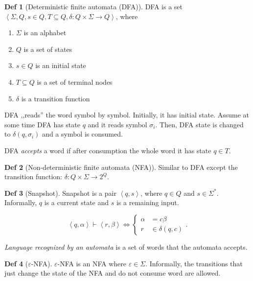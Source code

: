 \documentclass[a4paper]{article}
\theoremstyle{definition}
\newtheorem{definition}{Def}
\begin{document}
\begin{definition}[Deterministic finite automata (DFA)]
  DFA is a set \(\left< \Sigma, Q, s \in Q, T \subseteq Q, \delta : Q \times
  \Sigma \to Q\right>\), where
  \begin{enumerate}
    \item \(\Sigma\) is an alphabet
    \item \(Q\) is a set of states
    \item \(s \in Q\) is an initial state
    \item \(T \subseteq Q\) is a set of terminal nodes
    \item \(\delta\) is a transition function
  \end{enumerate}
\end{definition}

DFA ,,reads'' the word symbol by symbol.
Initially, it has initial state.
Assume at some time DFA has state \(q\) and it reads symbol \(\sigma_i\).
Then, DFA state is changed to \(\delta(q, \sigma_i)\) and a symbol is consumed.

DFA \textit{accepts} a word if after consumption the whole word it has state
\(q \in T\).


\begin{definition}[Non-deterministic finite automata (NFA)]
  Similar to DFA except the transition function:
  \(\delta : Q \times \Sigma \to 2^Q\).
\end{definition}

\begin{definition}[Snapshot]
  Snapshot is a pair \(\left<q, s\right>\), where \(q \in Q\) and \(s \in
  \Sigma^*\).
  Informally, \(q\) is a current state and \(s\) is a remaining input.
\end{definition}

\[
\left< q, \alpha \right> \vdash \left< r, \beta \right>
\iff
\begin{cases}
  \alpha &= c \beta \\
  r &\in \delta(q, c)
\end{cases}
.\]

\textit{Language recognized by an automata}
is a set of words that the automata accepts.

\begin{definition}[\(\varepsilon\)-NFA]
  \(\varepsilon\)-NFA is an NFA where \(\varepsilon \in \Sigma\).
  Informally, the transitions that just change the state of the NFA
  and do not consume word are allowed.
\end{definition}
\end{document}
